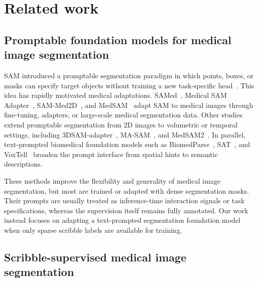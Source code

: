 \documentclass[preprint,12pt]{elsarticle}
\begin{document}
\section{Related work}
\label{sec:related_work}

\subsection{Promptable foundation models for medical image segmentation}

SAM introduced a promptable segmentation paradigm in which points, boxes, or masks can specify target objects without training a new task-specific head~\cite{kirillov2023sam}. This idea has rapidly motivated medical adaptations. SAMed~\cite{zhang2023samed}, Medical SAM Adapter~\cite{wu2025medicalsamadapter}, SAM-Med2D~\cite{cheng2023sammed2d}, and MedSAM~\cite{ma2024medsam} adapt SAM to medical images through fine-tuning, adapters, or large-scale medical segmentation data. Other studies extend promptable segmentation from 2D images to volumetric or temporal settings, including 3DSAM-adapter~\cite{gong2024threedsamadapter}, MA-SAM~\cite{chen2023masam}, and MedSAM2~\cite{ma2025medsam2}. In parallel, text-prompted biomedical foundation models such as BiomedParse~\cite{zhao2025biomedparse}, SAT~\cite{zhao2025sat}, and VoxTell~\cite{rokuss2026voxtell} broaden the prompt interface from spatial hints to semantic descriptions.

These methods improve the flexibility and generality of medical image segmentation, but most are trained or adapted with dense segmentation masks. Their prompts are usually treated as inference-time interaction signals or task specifications, whereas the supervision itself remains fully annotated. Our work instead focuses on adapting a text-prompted segmentation foundation model when only sparse scribble labels are available for training.

\subsection{Scribble-supervised medical image segmentation}
\end{document}
